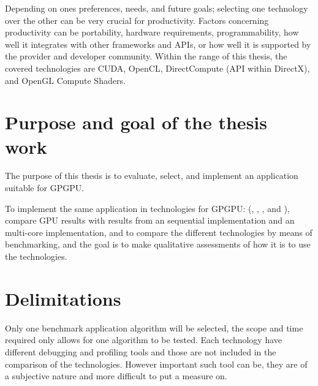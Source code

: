 Depending on ones preferences, needs, and future goals; selecting one technology over the other can be very crucial for productivity. Factors concerning productivity can be portability, hardware requirements, programmability, how well it integrates with other frameworks and \gls{API}s, or how well it is supported by the provider and developer community. Within the range of this thesis, the covered technologies are \gls{CUDA}, \gls{OpenCL}, DirectCompute (\gls{API} within DirectX), and \gls{OpenGL} Compute Shaders.

\section{Purpose and goal of the thesis work}
The purpose of this thesis is to evaluate, select, and implement an application suitable for \gls{GPGPU}.

To implement the same application in technologies for \gls{GPGPU}: ({\CU}, {\OCL}, {\DX}, and {\GL}), compare \gls{GPU} results with results from an sequential {\CPP} implementation and an multi-core {\OMP} implementation, and to compare the different technologies by means of benchmarking, and the goal is to make qualitative assessments of how it is to use the technologies.

\section{Delimitations}
Only one benchmark application algorithm will be selected, the scope and time required only allows for one algorithm to be tested. Each technology have different debugging and profiling tools and those are not included in the comparison of the technologies. However important such tool can be, they are of a subjective nature and more difficult to put a measure on.